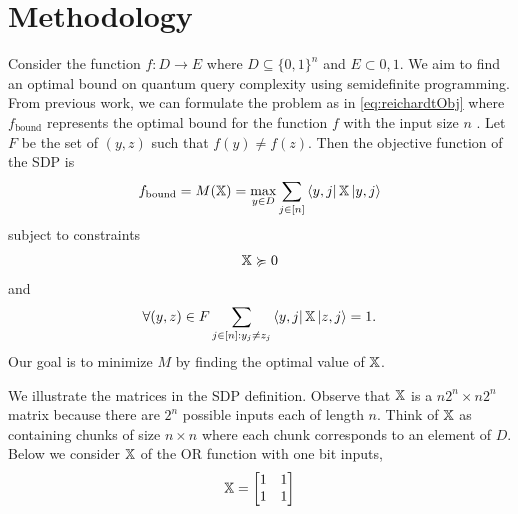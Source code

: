 \section{Methodology}

Consider the function $f: D \rightarrow E$ where $D
\subseteq {\{0,1\}}^n$ and $E \subset {0,1}$. We aim to find an
optimal bound on quantum query complexity using semidefinite
programming. From previous work,
we can formulate the problem as in \cref{eq:reichardtObj} where
$f_{\text{bound}}$ represents the optimal bound for the function
$f$ with the input size $n$ \cite{reichardt2009span}.
Let $F$ be the set of $(y,z)$ such that $f(y) \neq f(z)$.
Then the objective function of the SDP is
\begin{align} \label{eq:reichardtObj}
    f_{\text{bound}} = M(\operatorname{\mathbb{X}}) = \max_{y \in D} \sum_{j \in [n]}
    \bra{y,j}\operatorname{\mathbb{X}}\ket{y,j} 
\end{align}
subject to constraints
\begin{align}\label{Eq:semi1}
    \operatorname{\mathbb{X}} \succcurlyeq 0 
\end{align}
and
\begin{align}\label{Eq:off-diag}
    \forall (y,z) \in F \sum_{j \in [n]: y_j \ne z_j} 
    \bra{y,j} \operatorname{\mathbb{X}} \ket{z, j} = 1.
\end{align}
Our goal is to minimize $M$ by finding the optimal value of $\operatorname{\mathbb{X}}$.

We illustrate the matrices in the SDP definition.
Observe that $\operatorname{\mathbb{X}}$ is a $n2^n \times n2^n$ matrix 
because there are $2^n$ possible inputs each of length $n$. 
Think of $\operatorname{\mathbb{X}}$ as containing chunks of size 
$n \times n$ where each chunk corresponds to an element of $D$. %
Below we consider $\operatorname{\mathbb{X}}$ of the OR function with one bit inputs,
\begin{align}
    \operatorname{\mathbb{X}} = \left[
    \begin{matrix}
        1 & 1 \\
        1 & 1
    \end{matrix}
    \right]
\end{align}

